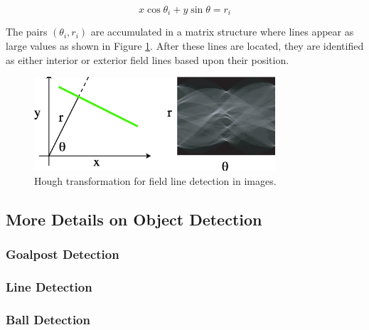 \documentclass{article}
\begin{document}
	\begin{equation}
		x \cos \theta_{i} + y \sin \theta = r_{i} 
	\end{equation}

	The pairs \((\theta_{i},r_{i})\) are accumulated in a matrix structure where lines appear as large values as shown in Figure \ref{fig:Hough}. After these lines are located, they are identified as either interior or exterior field lines based upon their position.

	\begin{figure}[H]
		\centering
		\includegraphics[width=0.8\textwidth]{figures/Hough.eps}
		\caption{Hough transformation for field line detection in images.}
  		\label{fig:Hough}
	\end{figure}

\subsection{More Details on Object Detection}


\subsubsection{Goalpost Detection}


\subsubsection{Line Detection}


\subsubsection{Ball Detection}
\end{document}
